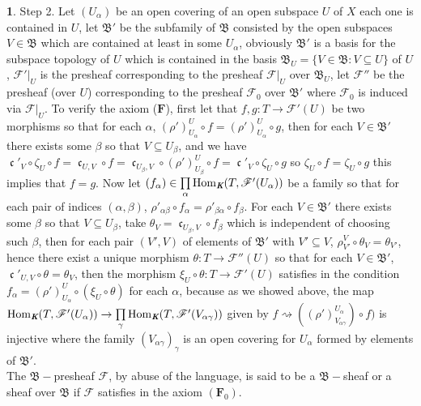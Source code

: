 \documentclass[12pt]{amsart}
\newcommand{\Hom}{\operatorname{Hom}}
\newcommand{\can}{\operatorname{\mathfrak{c}}}
\theoremstyle{definition}
\newtheorem{bk}[proposition]{}
\begin{document}
\begin{bk}
Step 2. Let $(U_{\alpha})$ be an open covering of an open subspace $U$ of $X$ each one is contained in $U$, let $\mathfrak{B}'$ be the subfamily of $\mathfrak{B}$ consisted by the open subspaces $V\in\mathfrak{B}$ which are contained at least in some $U_{\alpha}$, obviously $\mathfrak{B}'$ is a basis for the subspace topology of $U$ which is contained in the basis $\mathfrak{B}_{U}=\{V\in\mathfrak{B} : V\subseteq U\}$ of $U$, $\mathscr{F}'|_{U}$ is the presheaf corresponding to the presheaf $\mathscr{F}|_{U}$ over $\mathfrak{B}_{U}$, let $\mathscr{F}''$ be the presheaf (over $U$) corresponding to the presheaf $\mathscr{F}_{0}$ over $\mathfrak{B}'$ where $\mathscr{F}_{0}$ is induced via $\mathscr{F}|_{U}$. To verify the axiom  ($\textbf{F}$), first let that $f, g:T\rightarrow\mathscr{F}'(U)$ be two morphisms so that for each $\alpha$, $(\rho')_{U_{\alpha}}^{U}\circ f=(\rho')_{U_{\alpha}}^{U}\circ g$, then for each $V\in\mathfrak{B}'$ there exists some $\beta$ so that $V\subseteq U_{\beta}$, and we have $\can'_{V}\circ\zeta_{U}\circ f=\can_{U, V}\circ f=\can_{U_{\beta},V}\circ(\rho')_{U_{\beta}}^{U}\circ f=\can'_{V}\circ\zeta_{U}\circ g$ so $\zeta_{U}\circ f=\zeta_{U}\circ g$ this implies that $f=g$.  Now let $(f_{\alpha})\in\prod\limits_{\alpha}\Hom_{\emph{\textbf{K}}}(T, \mathscr{F}'(U_{\alpha}))$ be a family so that for each pair of indices $(\alpha, \beta)$, $\rho'_{\alpha\beta}\circ f_{\alpha}=\rho'_{\beta\alpha}\circ f_{\beta}$. For each $V\in\mathfrak{B}'$ there exists some $\beta$ so that $V\subseteq U_{\beta}$, take $\theta_{V}=\can_{U_{\beta}, V}\circ f_{\beta}$ which is independent of choosing such $\beta$, then for each pair $(V', V)$ of elements of $\mathfrak{B}'$ with $V'\subseteq V$,  $\rho_{V'}^{V}\circ\theta_{V}=\theta_{V'}$, hence there exist a unique morphism $\theta: T\rightarrow\mathscr{F}''(U)$ so that for each $V\in\mathfrak{B}'$, $\can'_{U, V}\circ\theta=\theta_{V}$, then the morphism $\xi_{U}\circ\theta:T\rightarrow\mathscr{F}'(U)$ satisfies in the condition $f_{\alpha}=(\rho')_{U_{\alpha}}^{U}\circ(\xi_{U}\circ\theta)$ for each $\alpha$, because as we showed above, the map $\Hom_{\emph{\textbf{K}}}(T, \mathscr{F}'(U_{\alpha}))\rightarrow
\prod\limits_{\gamma}\Hom_{\emph{\textbf{K}}}(T, \mathscr{F}'(V_{\alpha\gamma}))$ given by $f\rightsquigarrow((\rho')_{V_{\alpha\gamma}}^{U_{\alpha}})\circ f)$ is injective where the family $(V_{\alpha\gamma})_{\gamma}$
is an open covering for $U_{\alpha}$ formed by elements of $\mathfrak{B}'$.\\
The $\mathfrak{B}-$presheaf  $\mathscr{F}$, by abuse of the language, is said to be a $\mathfrak{B}-$sheaf or a sheaf over $\mathfrak{B}$ if $\mathscr{F}$ satisfies in the axiom $(\textbf{F}_{0})$.\\
\end{bk}
\end{document}
